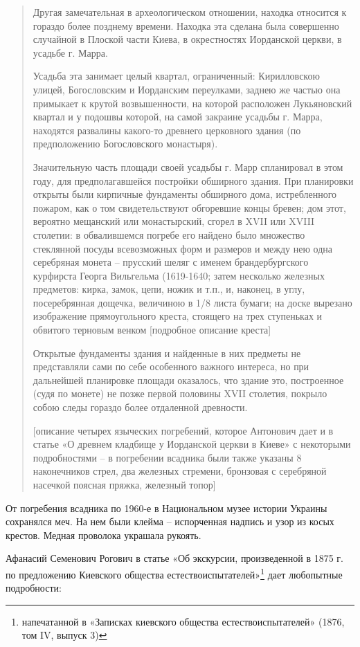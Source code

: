 \begin{quotation}
Другая замечательная в археологическом отношении, находка относится к гораздо более позднему времени. Находка эта сделана была совершенно случайной в Плоской части Киева, в окрестностях Иорданской церкви, в усадьбе г. Марра.

Усадьба эта занимает целый квартал, ограниченный: Кирилловскою улицей, Богословским и Иорданским переулками, заднею же частью она примыкает к крутой возвышенности, на которой расположен Лукьяновский квартал и у подошвы которой, на самой закраине усадьбы г. Марра, находятся развалины какого-то древнего церковного здания (по предположению Богословского монастыря).

Значительную часть площади своей усадьбы г. Марр спланировал в этом году, для предполагавшейся постройки обширного здания. При планировки открыты были кирпичные фундаменты обширного дома, истребленного пожаром, как о том свидетельствуют обгоревшие концы бревен; дом этот, вероятно мещанский или монастырский, сгорел в XVII или XVIII столетии: в обвалившемся погребе его найдено было множество стеклянной посуды всевозможных форм и размеров и между нею одна серебряная монета – прусский шеляг с именем брандербургского курфирста Георга Вильгельма (1619-1640; затем несколько железных предметов: кирка, замок, цепи, ножик и т.п., и, наконец, в углу, посеребрянная дощечка, величиною в 1/8 листа бумаги; на доске вырезано изображение прямоугольного креста, стоящего на трех ступеньках и обвитого терновым венком [подробное описание креста]

Открытые фундаменты здания и найденные в них предметы не представляли сами по себе особенного важного интереса, но при дальнейшей планировке площади оказалось, что здание это, построенное (судя по монете) не позже первой половины XVII столетия, покрыло собою следы гораздо более отдаленной древности.

[описание четырех языческих погребений, которое Антонович дает и в статье «О древнем кладбище у Иорданской церкви в Киеве» с некоторыми подробностями – в погребении всадника были также указаны 8 наконечников стрел, два железных стремени, бронзовая с серебряной насечкой поясная пряжка, железный топор]
\end{quotation}

От погребения всадника по 1960-е в Национальном музее истории Украины сохранялся меч. На нем были клейма – испорченная надпись и узор из косых крестов. Медная проволока украшала рукоять.

Афанасий Семенович Рогович в статье «Об экскурсии, произведенной в 1875 г. по предложению Киевского общества естествоиспытателей»\footnote{ напечатанной в «Записках киевского общества естествоиспытателей» (1876, том IV, выпуск 3)} дает любопытные подробности:

